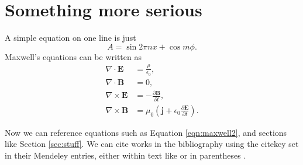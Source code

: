 \chapter{Something more serious}

A simple equation on one line is just
\begin{equation}
    A = \sin{2\pi nx} + \cos{m\phi}. \label{eqn:sincos}
\end{equation}
Maxwell's equations can be written as
\begin{align}
\nabla \cdot \bm{E} &= \frac \rho {\epsilon_0},  \label{eqn:maxwell1}\\
\nabla \cdot \bm{B} &= 0,  \label{eqn:maxwell2}\\
\nabla \times \bm{E} &= -\frac{\partial \bm{B}}{\partial t}, \label{eqn:maxwell3}\\
\nabla \times \bm{B} &= \mu_0 \left( \bm{j} + \epsilon_0 \frac{\partial \bm{E}}{\partial t}\right). \label{eqn:maxwell4}
\end{align}

Now we can reference equations such as Equation \ref{eqn:maxwell2}, and sections like Section \ref{sec:stuff}. We can cite works in the bibliography using the citekey set in their Mendeley entries, either within text like \cite{Gauss1838} or in parentheses \citep[e.g.][]{Gauss1838}.